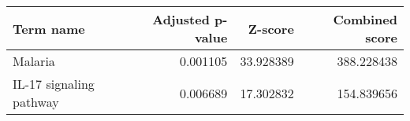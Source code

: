 \begin{tabular}{lrrr}
\toprule
              Term name &  Adjusted p-value &   Z-score &  Combined score \\
\midrule
                Malaria &          0.001105 & 33.928389 &      388.228438 \\
IL-17 signaling pathway &          0.006689 & 17.302832 &      154.839656 \\
\bottomrule
\end{tabular}
